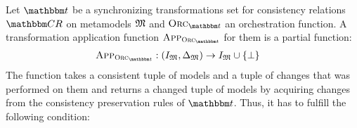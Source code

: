 \begin{definition} \label{def:applicationfunction}
    Let $\transformationset{T}$ be a synchronizing transformations set for consistency relations $\consistencyrelationset{CR}$ on metamodels $\metamodeltuple{M}$ and $\orcfunction{\transformationset{T}}$ an orchestration function.
    A transformation application function $\appfunction{\orcfunction{\transformationset{T}}}$ for them is a partial function:
    \begin{align*}
        &
        \appfunction{\orcfunction{\transformationset{T}}} : (\metamodeltupleinstanceset{M}, \changeuniverse{\metamodeltuple{M}}) \rightarrow \metamodeltupleinstanceset{M} \cup \setted{\bot}
    \end{align*}
    The function takes a consistent tuple of models and a tuple of changes that was performed on them and returns a changed tuple of models by acquiring changes from the consistency preservation rules of $\transformationset{t}$.
    Thus, it has to fulfill the following condition:
\end{definition}

